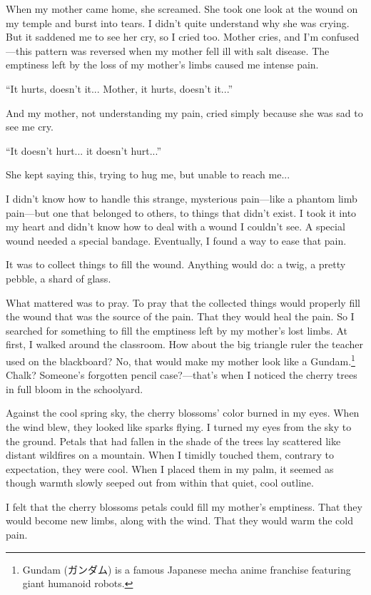 \documentclass[
    a4paper,
    12pt,
    twoside,
    openany,
    UTF8,
    fontset=windows
]{ctexbook}
\begin{document}
When my mother came home, she screamed. She took one look at the wound on my temple and burst into tears. I didn't quite understand why she was crying. But it saddened me to see her cry, so I cried too. Mother cries, and I'm confused---this pattern was reversed when my mother fell ill with salt disease. The emptiness left by the loss of my mother's limbs caused me intense pain.

``It hurts, doesn't it... Mother, it hurts, doesn't it...''

And my mother, not understanding my pain, cried simply because she was sad to see me cry.

``It doesn't hurt... it doesn't hurt...''

She kept saying this, trying to hug me, but unable to reach me...

I didn't know how to handle this strange, mysterious pain---like a phantom limb pain---but one that belonged to others, to things that didn't exist. I took it into my heart and didn't know how to deal with a wound I couldn't see. A special wound needed a special bandage. Eventually, I found a way to ease that pain.

It was to collect things to fill the wound. Anything would do: a twig, a pretty pebble, a shard of glass.

What mattered was to pray. To pray that the collected things would properly fill the wound that was the source of the pain. That they would heal the pain. So I searched for something to fill the emptiness left by my mother's lost limbs. At first, I walked around the classroom. How about the big triangle ruler the teacher used on the blackboard? No, that would make my mother look like a Gundam.\footnote{Gundam (ガンダム) is a famous Japanese mecha anime franchise featuring giant humanoid robots.} Chalk? Someone's forgotten pencil case?---that's when I noticed the cherry trees in full bloom in the schoolyard.

Against the cool spring sky, the cherry blossoms' color burned in my eyes. When the wind blew, they looked like sparks flying. I turned my eyes from the sky to the ground. Petals that had fallen in the shade of the trees lay scattered like distant wildfires on a mountain. When I timidly touched them, contrary to expectation, they were cool. When I placed them in my palm, it seemed as though warmth slowly seeped out from within that quiet, cool outline.

I felt that the cherry blossoms petals could fill my mother's emptiness. That they would become new limbs, along with the wind. That they would warm the cold pain.
\end{document}
